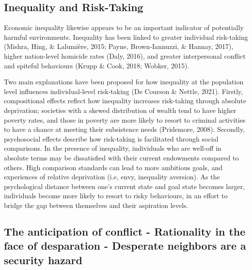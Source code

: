 \documentclass[
  english,
  man]{apa6}
\begin{document}
\hypertarget{inequality-and-risk-taking}{%
\subsection{Inequality and Risk-Taking}\label{inequality-and-risk-taking}}

Economic inequality likewise appears to be an important indicator of potentially harmful environments. Inequality has been linked to greater individual risk-taking (Mishra, Hing, \& Lalumière, 2015; Payne, Brown-Iannuzzi, \& Hannay, 2017), higher nation-level homicide rates (Daly, 2016), and greater interpersonal conflict and spiteful behaviours (Krupp \& Cook, 2018; Wobker, 2015).

Two main explanations have been proposed for how inequality at the population level influences individual-level risk-taking (De Courson \& Nettle, 2021). Firstly, compositional effects reflect how inequality increases risk-taking through absolute deprivation; societies with a skewed distribution of wealth tend to have higher poverty rates, and those in poverty are more likely to resort to criminal activities to have a chance at meeting their subsistence needs (Pridemore, 2008). Secondly, psychosocial effects describe how risk-taking is facilitated through social comparisons. In the presence of inequality, individuals who are well-off in absolute terms may be dissatisfied with their current endowments compared to others. High comparison standards can lead to more ambitious goals, and experiences of relative deprivation (i.e, envy, inequality aversion). As the psychological distance between one's current state and goal state becomes larger, individuals become more likely to resort to risky behaviours, in an effort to bridge the gap between themselves and their aspiration levels.

\hypertarget{the-anticipation-of-conflict---rationality-in-the-face-of-desparation---desperate-neighbors-are-a-security-hazard}{%
\subsection{\texorpdfstring{The anticipation of conflict - Rationality in the face of desparation - \textbf{Desperate neighbors are a security hazard}}{The anticipation of conflict - Rationality in the face of desparation - Desperate neighbors are a security hazard}}\label{the-anticipation-of-conflict---rationality-in-the-face-of-desparation---desperate-neighbors-are-a-security-hazard}}
\end{document}
